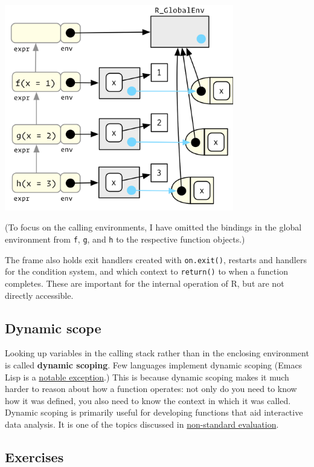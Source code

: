 \documentclass[]{book}
\theoremstyle{definition}
\theoremstyle{definition}
\theoremstyle{definition}
\theoremstyle{remark}
\begin{document}
\begin{center}\includegraphics[width=3.94in]{diagrams/environments/calling} \end{center}

(To focus on the calling environments, I have omitted the bindings in
the global environment from \texttt{f}, \texttt{g}, and \texttt{h} to
the respective function objects.)

The frame also holds exit handlers created with \texttt{on.exit()},
restarts and handlers for the condition system, and which context to
\texttt{return()} to when a function completes. These are important for
the internal operation of R, but are not directly accessible.

\hypertarget{dynamic-scope}{%
\subsection{Dynamic scope}\label{dynamic-scope}}

Looking up variables in the calling stack rather than in the enclosing
environment is called \textbf{dynamic scoping}. Few languages implement
dynamic scoping (Emacs Lisp is a
\href{http://www.gnu.org/software/emacs/emacs-paper.html\#SEC15}{notable
exception}.) This is because dynamic scoping makes it much harder to
reason about how a function operates: not only do you need to know how
it was defined, you also need to know the context in which it was
called. Dynamic scoping is primarily useful for developing functions
that aid interactive data analysis. It is one of the topics discussed in
\protect\hyperlink{nse}{non-standard evaluation}.

\hypertarget{exercises-9}{%
\subsection{Exercises}\label{exercises-9}}
\end{document}

